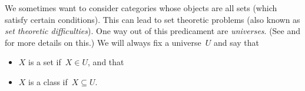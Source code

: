 \begin{remark}
  We sometimes want to consider categories whose objects are all sets (which satisfy certain conditions).
  This can lead to set theoretic problems (also known as \emph{set theoretic difficulties}).
  One way out of this predicament are \emph{universes}.
  (See \cite[I.6]{Working} and \cite[3.2]{Schubert} for more details on this.)
  We will always fix a universe~$U$ and say that
  \begin{itemize}
    \item
      $X$ is a set if~$X \in U$, and that
    \item
      $X$ is a class if~$X \subseteq U$.
  \end{itemize}
\end{remark}









